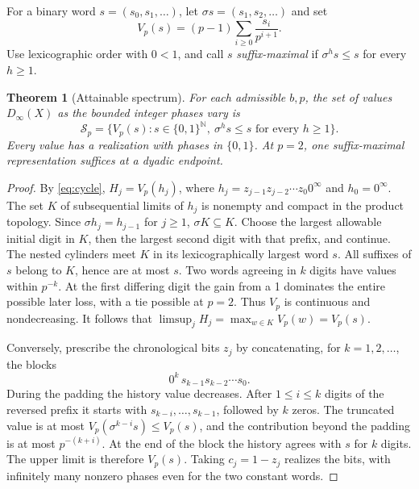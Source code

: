 \documentclass[11pt]{article}
\newtheorem{theorem}{Theorem}
\begin{document}
For a binary word \(s=(s_0,s_1,\ldots)\), let \(\sigma s=(s_1,s_2,\ldots)\) and set
\[
 V_p(s)=(p-1)\sum_{i\ge0}\frac{s_i}{p^{i+1}} .
\]
Use lexicographic order with \(0<1\), and call \(s\) \emph{suffix-maximal} if \(\sigma^h s\le s\) for every \(h\ge1\).

\begin{theorem}[Attainable spectrum]\label{th:spectrum}
For each admissible \(b,p\), the set of values \(D_\infty(X)\) as the bounded integer phases vary is
\[
 \mathcal S_p=\{V_p(s):s\in\{0,1\}^{\mathbb N},\ \sigma^h s\le s\text{ for every }h\ge1\}.
\]
Every value has a realization with phases in \(\{0,1\}\). At \(p=2\), one suffix-maximal representation suffices at a dyadic endpoint.
\end{theorem}
\begin{proof}
By \eqref{eq:cycle}, \(H_j=V_p(h_j)\), where \(h_j=z_{j-1}z_{j-2}\cdots z_0 0^\infty\) and \(h_0=0^\infty\). The set \(K\) of subsequential limits of \(h_j\) is nonempty and compact in the product topology. Since \(\sigma h_j=h_{j-1}\) for \(j\ge1\), \(\sigma K\subseteq K\). Choose the largest allowable initial digit in \(K\), then the largest second digit with that prefix, and continue. The nested cylinders meet \(K\) in its lexicographically largest word \(s\). All suffixes of \(s\) belong to \(K\), hence are at most \(s\). Two words agreeing in \(k\) digits have values within \(p^{-k}\). At the first differing digit the gain from a 1 dominates the entire possible later loss, with a tie possible at \(p=2\). Thus \(V_p\) is continuous and nondecreasing. It follows that \(\limsup_j H_j=\max_{w\in K}V_p(w)=V_p(s)\).

Conversely, prescribe the chronological bits \(z_j\) by concatenating, for \(k=1,2,\ldots\), the blocks
\[
 0^k\,s_{k-1}s_{k-2}\cdots s_0 .
\]
During the padding the history value decreases. After \(1\le i\le k\) digits of the reversed prefix it starts with \(s_{k-i},\ldots,s_{k-1}\), followed by \(k\) zeros. The truncated value is at most \(V_p(\sigma^{k-i}s)\le V_p(s)\), and the contribution beyond the padding is at most \(p^{-(k+i)}\). At the end of the block the history agrees with \(s\) for \(k\) digits. The upper limit is therefore \(V_p(s)\). Taking \(c_j=1-z_j\) realizes the bits, with infinitely many nonzero phases even for the two constant words.
\end{proof}
\end{document}
